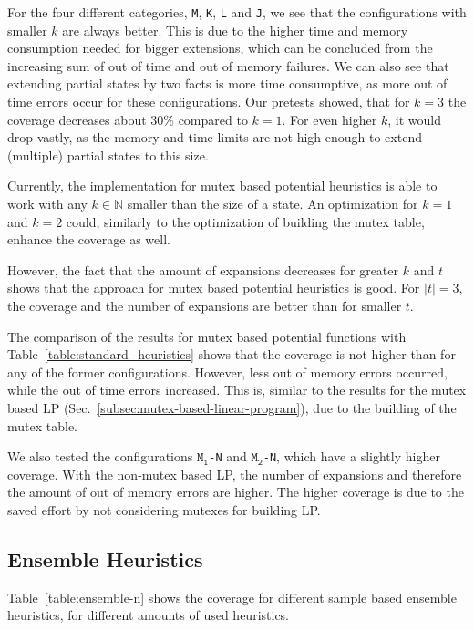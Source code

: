 For the four different categories, \texttt{M}, \texttt{K}, \texttt{L} and \texttt{J}, we see that the configurations with smaller $k$ are always  better.
This is due to the higher time and memory consumption needed for bigger extensions, which can be concluded from the increasing sum of out of time and out of memory failures.
We can also see that extending partial states by two facts is more time consumptive, as more out of time errors occur for these configurations.
Our pretests showed, that for $k=3$ the coverage decreases about 30\% compared to $k=1$.
For even higher $k$, it would drop vastly, as the memory and time limits are not high enough to extend (multiple) partial states to this size.

Currently, the implementation for mutex based potential heuristics is able to work with any $k\in \mathbb{N}$ smaller than the size of a state.
An optimization for $k=1$ and $k=2$ could, similarly to the optimization of building the mutex table, enhance the coverage as well.

However, the fact that the amount of expansions decreases for greater $k$ and $t$ shows that the approach for mutex based potential heuristics is good.
For $|t|=3$, the coverage and the number of expansions are better than for smaller $t$.

The comparison of the results for mutex based potential functions with Table~\ref{table:standard_heuristics} shows that the coverage is not higher than for any of the former configurations.
However, less out of memory errors occurred, while the out of time errors increased.
This is, similar to the results for the mutex based LP (Sec.~\ref{subsec:mutex-based-linear-program}), due to the building of the mutex table.

We also tested the configurations $\texttt{M}_\texttt{1}$\texttt{-N} and $\texttt{M}_\texttt{2}$\texttt{-N}, which have a slightly higher coverage.
With the non-mutex based LP, the number of expansions and therefore the amount of out of memory errors are higher.
The higher coverage is due to the saved effort by not considering mutexes for building LP.

\subsection{Ensemble Heuristics}\label{subsec:mutex-based-ensemble-heuristics}
Table~\ref{table:ensemble-n} shows the coverage for different sample based ensemble heuristics, for different amounts of used heuristics.

